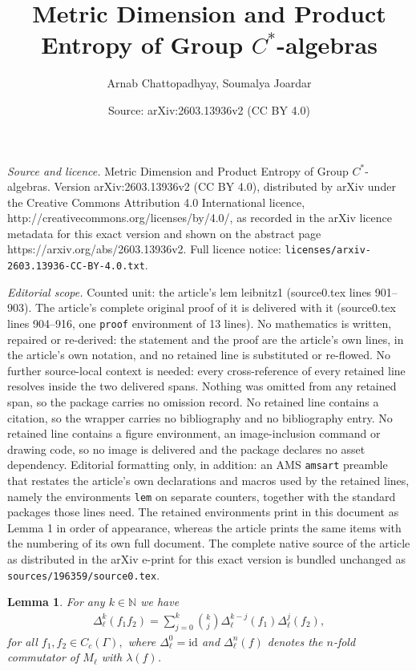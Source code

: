 \documentclass[10pt,a4paper]{amsart}
\title{Metric Dimension and Product Entropy of Group $C^{\ast}$-algebras}
\author{Arnab Chattopadhyay, Soumalya Joardar}
\date{Source: arXiv:2603.13936v2 (CC BY 4.0)}
\newtheorem{lem}{Lemma}
\newcommand{\Bea}{\begin{eqnarray*}}
\newcommand{\Eea}{\end{eqnarray*}}
\begin{document}
\maketitle

\noindent\emph{Source and licence.} Metric Dimension and Product Entropy of Group $C^{\ast}$-algebras. Version arXiv:2603.13936v2 (CC BY 4.0), distributed by arXiv under the Creative Commons Attribution 4.0 International licence, http://creativecommons.org/licenses/by/4.0/, as recorded in the arXiv licence metadata for this exact version and shown on the abstract page https://arxiv.org/abs/2603.13936v2. Full licence notice: \texttt{licenses/arxiv-2603.13936-CC-BY-4.0.txt}.\par\smallskip

\noindent\textit{Editorial scope.} Counted unit: the article's lem leibnitz1 (source0.tex lines 901--903). The article's complete original proof of it is delivered with it (source0.tex lines 904--916, one \texttt{proof} environment of 13 lines). No mathematics is written, repaired or re-derived: the statement and the proof are the article's own lines, in the article's own notation, and no retained line is substituted or re-flowed.  No further source-local context is needed: every cross-reference of every retained line resolves inside the two delivered spans.  Nothing was omitted from any retained span, so the package carries no omission record.  No retained line contains a citation, so the wrapper carries no bibliography and no bibliography entry.  No retained line contains a figure environment, an image-inclusion command or drawing code, so no image is delivered and the package declares no asset dependency.  Editorial formatting only, in addition: an AMS \texttt{amsart} preamble that restates the article's own declarations and macros used by the retained lines, namely the environments \texttt{lem} on separate counters, together with the standard packages those lines need.  The retained environments print in this document as Lemma 1 in order of appearance, whereas the article prints the same items with the numbering of its own full document.  The complete native source of the article as distributed in the arXiv e-print for this exact version is bundled unchanged as \texttt{sources/196359/source0.tex}.
\begin{lem} \label{leibnitz1}
For any $k \in \mathbb N$ we have \Bea \Delta_{\ell}^{k} (f_{1}f_{2}) = \sum\limits_{j = 0}^{k} \binom {k} {j} \Delta_{\ell}^{k - j} (f_{1}) \Delta_{\ell}^{j} (f_{2}), \Eea for all $f_{1},f_{2}\in C_{c}(\Gamma),$ where $\Delta_{\ell}^{0} = \text {id}$ and $\Delta_{\ell}^{n} (f)$ denotes the $n$-fold commutator of $M_{\ell}$ with $\lambda(f)$.
\end{lem}
\end{document}
